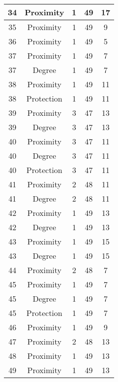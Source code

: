 \documentclass[results.tex]{subfiles}
\begin{document}
\begin{center}
\begin{tabular}{| c || c | c | c | c |}
    34 & Proximity & 1 & 49 & 17 \\ 
    \hline
    35 & Proximity & 1 & 49 & 9 \\ 
    \hline
    36 & Proximity & 1 & 49 & 5 \\ 
    \hline
    37 & Proximity & 1 & 49 & 7 \\ 
    \hline
    37 & Degree & 1 & 49 & 7 \\ 
    \hline
    38 & Proximity & 1 & 49 & 11 \\ 
    \hline
    38 & Protection & 1 & 49 & 11 \\ 
    \hline
    39 & Proximity & 3 & 47 & 13 \\ 
    \hline
    39 & Degree & 3 & 47 & 13 \\ 
    \hline
    40 & Proximity & 3 & 47 & 11 \\ 
    \hline
    40 & Degree & 3 & 47 & 11 \\ 
    \hline
    40 & Protection & 3 & 47 & 11 \\ 
    \hline
    41 & Proximity & 2 & 48 & 11 \\ 
    \hline
    41 & Degree & 2 & 48 & 11 \\ 
    \hline
    42 & Proximity & 1 & 49 & 13 \\ 
    \hline
    42 & Degree & 1 & 49 & 13 \\ 
    \hline
    43 & Proximity & 1 & 49 & 15 \\ 
    \hline
    43 & Degree & 1 & 49 & 15 \\ 
    \hline
    44 & Proximity & 2 & 48 & 7 \\ 
    \hline
    45 & Proximity & 1 & 49 & 7 \\ 
    \hline
    45 & Degree & 1 & 49 & 7 \\ 
    \hline
    45 & Protection & 1 & 49 & 7 \\ 
    \hline
    46 & Proximity & 1 & 49 & 9 \\ 
    \hline
    47 & Proximity & 2 & 48 & 13 \\ 
    \hline
    48 & Proximity & 1 & 49 & 13 \\ 
    \hline
    49 & Proximity & 1 & 49 & 13 \\ 
    \hline   \end{tabular}
\end{center}
\end{document}
